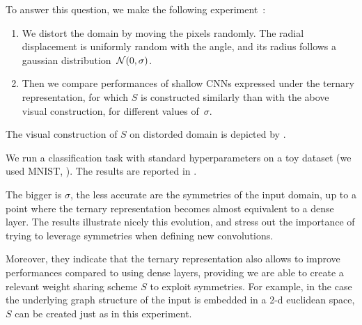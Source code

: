 To answer this question, we make the following experiment~\citep{vialatte2016generalizing}:
\begin{enumerate}
\item We distort the domain by moving the pixels randomly. The radial displacement is uniformly random with the angle, and its radius follows a gaussian distribution~$\mathcal{N}(0,\sigma)$.
\item Then we compare performances of shallow CNNs expressed under the ternary representation, for which $S$ is constructed similarly than with the above visual construction, for different values of~$\sigma$.
\end{enumerate}

The visual construction of $S$ on distorded domain is depicted by .



We run a classification task with standard hyperparameters on a toy dataset (we used MNIST, \cite{lecun1998mnist}). The results are reported in .



The bigger is $\sigma$, the less accurate are the symmetries of the input domain, up to a point where the ternary representation becomes almost equivalent to a dense layer. The results illustrate nicely this evolution, and stress out the importance of trying to leverage symmetries when defining new convolutions.

Moreover, they indicate that the ternary representation also allows to improve performances compared to using dense layers, providing we are able to create a relevant weight sharing scheme $S$ to exploit symmetries. For example, in the case the underlying graph structure of the input is embedded in a 2-d euclidean space, $S$ can be created just as in this experiment.



